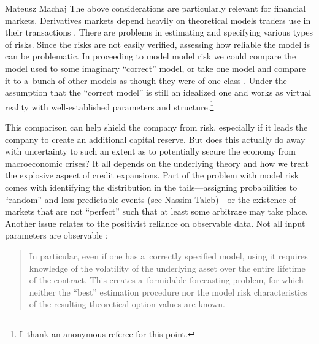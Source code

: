 \begin{artengenv}{Mateusz Machaj}
The above considerations are particularly relevant for financial markets. Derivatives markets depend heavily on theoretical models traders use in their transactions 
\parencite[][p.1466]{green_market_1999}. %
 There are problems in estimating and specifying various types of risks. Since the risks are not easily verified, assessing how reliable the model is can be problematic. In proceeding to model model risk we could compare the model used to some imaginary ``correct'' model, or take one model and compare it to a~bunch of other models as though they were of one class 
\parencite[][p.268]{kerkhof_model_2010}. %
 Under the assumption that the ``correct model'' is still an idealized one and works as virtual reality with well-established parameters and structure.\footnote{I~thank an anonymous referee for this point.}



This comparison can help shield the company from risk, especially if it leads the company to create an additional capital reserve. But does this actually do away with uncertainty to such an extent as to potentially secure the economy from macroeconomic crises? It all depends on the underlying theory and how we treat the explosive aspect of credit expansions. Part of the problem with model risk comes with identifying the distribution in the tails---assigning probabilities to ``random'' and less predictable events (see Nassim Taleb)---or the existence of markets that are not ``perfect'' such that at least some arbitrage may take place. Another issue relates to the positivist reliance on observable data. Not all input parameters are observable 
\parencite[][p.1467]{green_market_1999}:%
\begin{quote}
In particular, even if one has a~correctly specified model, using it requires knowledge of the volatility of the underlying asset over the entire lifetime of the contract. This creates a~formidable forecasting problem, for which neither the ``best'' estimation procedure nor the model risk characteristics of the resulting theoretical option values are known.
\end{quote}




\end{artengenv}

